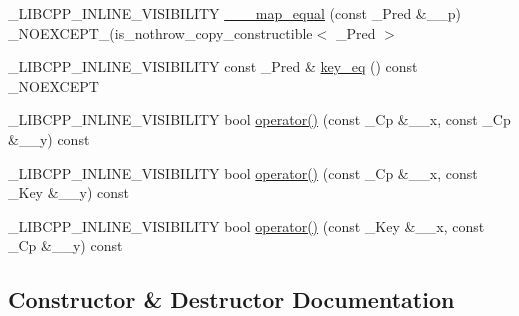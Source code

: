 \begin{DoxyCompactItemize}
\item 
\+\_\+\+L\+I\+B\+C\+P\+P\+\_\+\+I\+N\+L\+I\+N\+E\+\_\+\+V\+I\+S\+I\+B\+I\+L\+I\+T\+Y \hyperlink{class______map__equal_3_01___key_00_01___cp_00_01___pred_00_01false_01_4_a20796310662e2eb592cacef4385b3223}{\+\_\+\+\_\+\+\_\+map\+\_\+equal} (const \+\_\+\+Pred \&\+\_\+\+\_\+p) \+\_\+\+N\+O\+E\+X\+C\+E\+P\+T\+\_\+(is\+\_\+nothrow\+\_\+copy\+\_\+constructible$<$ \+\_\+\+Pred $>$
\item 
\+\_\+\+L\+I\+B\+C\+P\+P\+\_\+\+I\+N\+L\+I\+N\+E\+\_\+\+V\+I\+S\+I\+B\+I\+L\+I\+T\+Y const \+\_\+\+Pred \& \hyperlink{class______map__equal_3_01___key_00_01___cp_00_01___pred_00_01false_01_4_a3bf1ce76006942fec62d148d68ac498b}{key\+\_\+eq} () const \+\_\+\+N\+O\+E\+X\+C\+E\+P\+T
\item 
\+\_\+\+L\+I\+B\+C\+P\+P\+\_\+\+I\+N\+L\+I\+N\+E\+\_\+\+V\+I\+S\+I\+B\+I\+L\+I\+T\+Y bool \hyperlink{class______map__equal_3_01___key_00_01___cp_00_01___pred_00_01false_01_4_a610f1a9c10d40791c098fe1af3beaf57}{operator()} (const \+\_\+\+Cp \&\+\_\+\+\_\+x, const \+\_\+\+Cp \&\+\_\+\+\_\+y) const 
\item 
\+\_\+\+L\+I\+B\+C\+P\+P\+\_\+\+I\+N\+L\+I\+N\+E\+\_\+\+V\+I\+S\+I\+B\+I\+L\+I\+T\+Y bool \hyperlink{class______map__equal_3_01___key_00_01___cp_00_01___pred_00_01false_01_4_af3ff9fb13ef0c4d455bdd274adf3b579}{operator()} (const \+\_\+\+Cp \&\+\_\+\+\_\+x, const \+\_\+\+Key \&\+\_\+\+\_\+y) const 
\item 
\+\_\+\+L\+I\+B\+C\+P\+P\+\_\+\+I\+N\+L\+I\+N\+E\+\_\+\+V\+I\+S\+I\+B\+I\+L\+I\+T\+Y bool \hyperlink{class______map__equal_3_01___key_00_01___cp_00_01___pred_00_01false_01_4_a2ae80d5d4f0899ce42eac8bba386eb9c}{operator()} (const \+\_\+\+Key \&\+\_\+\+\_\+x, const \+\_\+\+Cp \&\+\_\+\+\_\+y) const 
\end{DoxyCompactItemize}


\subsection{Constructor \& Destructor Documentation}
\hypertarget{class______map__equal_3_01___key_00_01___cp_00_01___pred_00_01false_01_4_a58d140185db242b2e905f1e094957896}{}
